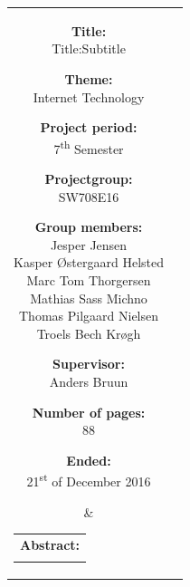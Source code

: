 \begin{titlepage}
\begin{nopagebreak}
{            \noindent
            \begin{tabular}{cc}
                \parbox[t]{.40\textwidth}{
                    \begin{description}
                        \item {\bf Title:}\\
                        Title:Subtitle
                        \item {\bf Theme:}\\
                        Internet Technology
                        \item {\bf Project period:}\\
                            7\textsuperscript{th} Semester
                            \hspace{4cm}
                        \item {\bf Projectgroup:}\\
                            SW708E16
                            \hspace{4cm}
                        \item {\bf Group members:}\\
                        Jesper Jensen \\
                        Kasper Østergaard Helsted \\
                        Marc Tom Thorgersen \\
                        Mathias Sass Michno \\
                        Thomas Pilgaard Nielsen \\
                        Troels Bech Krøgh
                        \item {\bf Supervisor:}\\
                            Anders Bruun
                        \item {\bf Number of pages:}\\
                            88
                        \item {\bf Ended:}\\
                            21\textsuperscript{st} of December 2016
                    \end{description}
                } &
                \parbox[t]{.45\textwidth}{
                    \begin{tabular}[t]{l}
                        {\bf Abstract:}\bigskip \\
                        \fbox{
                            \parbox{.45\textwidth}{\smallskip
                                {\vfill{\small
                                        
                                \smallskip}}
                            }
                        }
                    \end{tabular}
                }
            \end{tabular}
        }
    \end{nopagebreak}
\end{titlepage}
